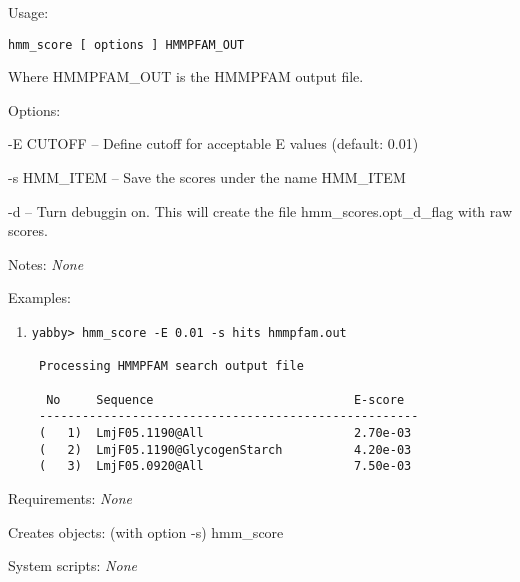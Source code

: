 \begin{description}


\item{Usage:}

{\tt hmm\_score [ options ] HMMPFAM\_OUT}

Where HMMPFAM\_OUT is the HMMPFAM output file.


\item{Options:}
\begin{description}
\item -E CUTOFF -- Define cutoff for acceptable E values (default: 0.01)
\item -s HMM\_ITEM -- Save the scores under the name HMM\_ITEM
\item -d -- Turn debuggin on. 
            This will create the file hmm\_scores.opt\_d\_flag with raw scores.
\end{description}


\item{Notes:} {\em None}


\item{Examples:}
\begin{enumerate}

\item
\begin{verbatim}
yabby> hmm_score -E 0.01 -s hits hmmpfam.out

 Processing HMMPFAM search output file

  No     Sequence                            E-score
 -----------------------------------------------------
 (   1)  LmjF05.1190@All                     2.70e-03
 (   2)  LmjF05.1190@GlycogenStarch          4.20e-03
 (   3)  LmjF05.0920@All                     7.50e-03

\end{verbatim}

\end{enumerate}


\item{Requirements:} {\em None}


\item{Creates objects:} (with option -s) hmm\_score


\item{System scripts:} {\em None}

\end{description}

